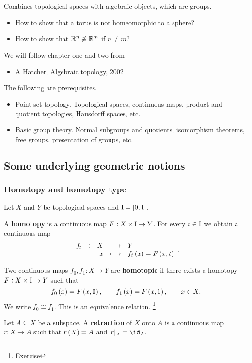 Combines topological spaces with algebraic objects, which are groups.
\begin{itemize}
\item How to show that a torus is not homeomorphic to a sphere?
\item How to show that $ \mathbb{R}^n \ncong \mathbb{R}^m $ if $ n \ne m $?
\end{itemize}
We will follow chapter one and two from
\begin{itemize}
\item A Hatcher, Algebraic topology, 2002
\end{itemize}
The following are prerequisites.
\begin{itemize}
\item Point set topology. Topological spaces, continuous maps, product and quotient topologies, Hausdorff spaces, etc.
\item Basic group theory. Normal subgroups and quotients, isomorphism theorems, free groups, presentation of groups, etc.
\end{itemize}

\subsection{Some underlying geometric notions}

\subsubsection{Homotopy and homotopy type}

Let $ X $ and $ Y $ be topological spaces and $ \I = \sbr{0, 1} $.

\begin{definition*}
A \textbf{homotopy} is a continuous map $ F : X \times \mathrm{I} \to Y $. For every $ t \in \mathrm{I} $ we obtain a continuous map
$$ \function[f_t]{X}{Y}{x}{f_t\br{x} = F\br{x, t}}. $$
\end{definition*}

\begin{definition*}
Two continuous maps $ f_0, f_1 : X \to Y $ are \textbf{homotopic} if there exists a homotopy $ F : X \times \mathrm{I} \to Y $ such that
$$ f_0\br{x} = F\br{x, 0}, \qquad f_1\br{x} = F\br{x, 1}, \qquad x \in X. $$
We write $ f_0 \cong f_1 $. This is an equivalence relation. \footnote{Exercise}
\end{definition*}

\begin{definition*}
Let $ A \subseteq X $ be a subspace. A \textbf{retraction} of $ X $ onto $ A $ is a continuous map $ r : X \to A $ such that $ r\br{X} = A $ and $ \eval{r}_A = \id_A $.
\end{definition*}

